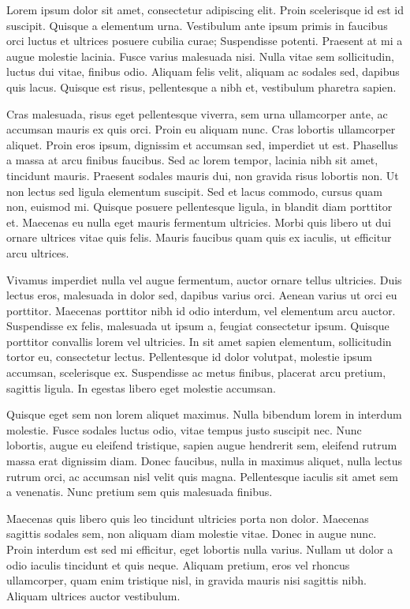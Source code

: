 \documentclass{homework}
\begin{document}
Lorem ipsum dolor sit amet, consectetur adipiscing elit. Proin scelerisque id est id suscipit. Quisque a elementum urna. Vestibulum ante ipsum primis in faucibus orci luctus et ultrices posuere cubilia curae; Suspendisse potenti. Praesent at mi a augue molestie lacinia. Fusce varius malesuada nisi. Nulla vitae sem sollicitudin, luctus dui vitae, finibus odio. Aliquam felis velit, aliquam ac sodales sed, dapibus quis lacus. Quisque est risus, pellentesque a nibh et, vestibulum pharetra sapien.

Cras malesuada, risus eget pellentesque viverra, sem urna ullamcorper ante, ac accumsan mauris ex quis orci. Proin eu aliquam nunc. Cras lobortis ullamcorper aliquet. Proin eros ipsum, dignissim et accumsan sed, imperdiet ut est. Phasellus a massa at arcu finibus faucibus. Sed ac lorem tempor, lacinia nibh sit amet, tincidunt mauris. Praesent sodales mauris dui, non gravida risus lobortis non. Ut non lectus sed ligula elementum suscipit. Sed et lacus commodo, cursus quam non, euismod mi. Quisque posuere pellentesque ligula, in blandit diam porttitor et. Maecenas eu nulla eget mauris fermentum ultricies. Morbi quis libero ut dui ornare ultrices vitae quis felis. Mauris faucibus quam quis ex iaculis, ut efficitur arcu ultrices.

Vivamus imperdiet nulla vel augue fermentum, auctor ornare tellus ultricies. Duis lectus eros, malesuada in dolor sed, dapibus varius orci. Aenean varius ut orci eu porttitor. Maecenas porttitor nibh id odio interdum, vel elementum arcu auctor. Suspendisse ex felis, malesuada ut ipsum a, feugiat consectetur ipsum. Quisque porttitor convallis lorem vel ultricies. In sit amet sapien elementum, sollicitudin tortor eu, consectetur lectus. Pellentesque id dolor volutpat, molestie ipsum accumsan, scelerisque ex. Suspendisse ac metus finibus, placerat arcu pretium, sagittis ligula. In egestas libero eget molestie accumsan.

Quisque eget sem non lorem aliquet maximus. Nulla bibendum lorem in interdum molestie. Fusce sodales luctus odio, vitae tempus justo suscipit nec. Nunc lobortis, augue eu eleifend tristique, sapien augue hendrerit sem, eleifend rutrum massa erat dignissim diam. Donec faucibus, nulla in maximus aliquet, nulla lectus rutrum orci, ac accumsan nisl velit quis magna. Pellentesque iaculis sit amet sem a venenatis. Nunc pretium sem quis malesuada finibus.

Maecenas quis libero quis leo tincidunt ultricies porta non dolor. Maecenas sagittis sodales sem, non aliquam diam molestie vitae. Donec in augue nunc. Proin interdum est sed mi efficitur, eget lobortis nulla varius. Nullam ut dolor a odio iaculis tincidunt et quis neque. Aliquam pretium, eros vel rhoncus ullamcorper, quam enim tristique nisl, in gravida mauris nisi sagittis nibh. Aliquam ultrices auctor vestibulum.
\end{document}
